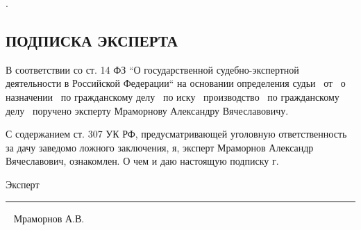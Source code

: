 \setcounter{page}{1}
\pagestyle{empty} %

%
%
.
\vspace{50mm}

\begin{center}
	\section{{\Large \textbf{ПОДПИСКА      ЭКСПЕРТА}}}
\end{center}




В соответствии со ст. 14  ФЗ “О государственной судебно-экспертной деятельности в Российской Федерации“ на основании определения судьи \sud \,  от \dataopr  \, о назначении \opr \, по гражданскому делу \delonum \, по иску \isk \,  производство \opr \, по гражданскому делу \delonum \, поручено эксперту   Мраморнову Александру Вячеславовичу. 

\vspace{5mm}

С содержанием ст. 307 УК РФ, предусматривающей уголовную ответственность за дачу заведомо ложного заключения, я, эксперт Мраморнов Александр Вячеславович, ознакомлен.  О  чем и даю настоящую подписку \datastart г.





\vspace{30mm}

{Эксперт}\hfill      \rule{4cm}{0.1 mm} \,\,\,      {Мраморнов А.В.}